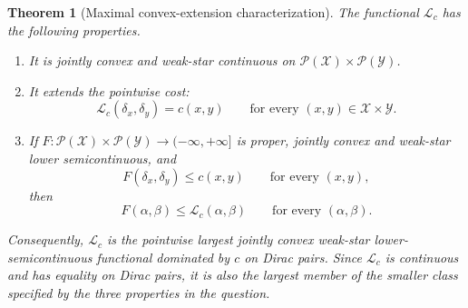 \documentclass[11pt]{article}
\newtheorem{theorem}{Theorem}[section]
\theoremstyle{definition}
\theoremstyle{remark}
\newcommand{\Pcal}{\mathcal P}
\newcommand{\Lc}{\mathcal L_c}
\begin{document}
\begin{theorem}[Maximal convex-extension characterization]
\label{thm:maximal-convex-extension}
The functional $\Lc$ has the following properties.
\begin{enumerate}
  \item It is jointly convex and weak-star continuous on
  $\Pcal(\mathcal X)\times\Pcal(\mathcal Y)$.
  \item It extends the pointwise cost:
  \[
    \Lc(\delta_x,\delta_y)=c(x,y)
    \qquad\text{for every }(x,y)\in\mathcal X\times\mathcal Y.
  \]
  \item If $F:\Pcal(\mathcal X)\times\Pcal(\mathcal Y)
  \to(-\infty,+\infty]$ is proper, jointly convex and weak-star lower
  semicontinuous, and
  \begin{equation}\label{eq:dirac-domination}
    F(\delta_x,\delta_y)\leq c(x,y)
    \qquad\text{for every }(x,y),
  \end{equation}
  then
  \begin{equation}\label{eq:maximality}
    F(\alpha,\beta)\leq\Lc(\alpha,\beta)
    \qquad\text{for every }(\alpha,\beta).
  \end{equation}
\end{enumerate}
Consequently, $\Lc$ is the pointwise largest jointly convex weak-star
lower-semicontinuous functional dominated by $c$ on Dirac pairs. Since $\Lc$
is continuous and has equality on Dirac pairs, it is also the largest member
of the smaller class specified by the three properties in the question.
\end{theorem}
\end{document}

